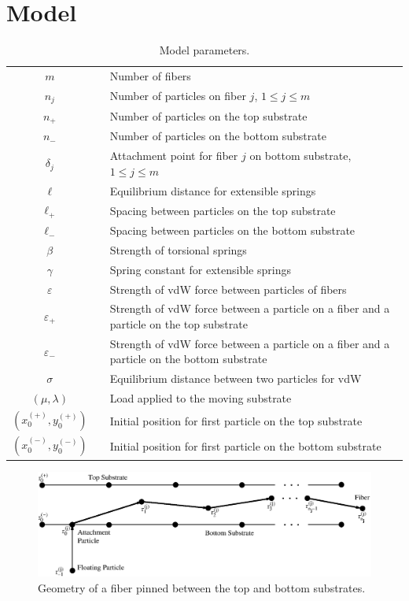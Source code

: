 \chapter{Model} \label{chap:two}

\begin{table}
	\centering
	\caption{Model parameters. \label{table:parameters}}
	\begin{tabular}{c p{.25in} p{4.5in}}
		$m$ & & Number of fibers \\
		$n_j$ & & Number of particles on fiber $j$, $1 \leq j \leq m$ \\
		$n_+$ & & Number of particles on the top substrate \\
		$n_-$ & & Number of particles on the bottom substrate \\
		$\delta_j$ & & Attachment point for fiber $j$ on bottom substrate, $1 \leq j \leq m$ \\
		$\ell$ & & Equilibrium distance for extensible springs \\
		$\ell_+$ & & Spacing between particles on the top substrate \\
		$\ell_-$ & & Spacing between particles on the bottom substrate \\
		$\beta$ & & Strength of torsional springs \\
		$\gamma$ & & Spring constant for extensible springs \\
		$\varepsilon$ & & Strength of vdW force between particles of fibers \\
		$\varepsilon_+$ & & Strength of vdW force between a particle on a fiber and a particle on the top substrate \\
		$\varepsilon_-$ & & Strength of vdW force between a particle on a fiber and a particle on the bottom substrate \\
		$\sigma$ & & Equilibrium distance between two particles for vdW \\
		$(\mu,\lambda)$ & & Load applied to the moving substrate \\
		$(x^{(+)}_0,y^{(+)}_0)$ & & Initial position for first particle on the top substrate \\
		$(x^{(-)}_0,y^{(-)}_0)$ & & Initial position for first particle on the bottom substrate
	\end{tabular}
\end{table}
	
	\begin{figure}
		\begin{center}
			\includegraphics[scale=.75]{./old_fig/Geometry.eps}
		\end{center}		
		\caption{Geometry of a fiber pinned between the top and bottom substrates.
		\label{fig:Geometry}}
	\end{figure}		
	
